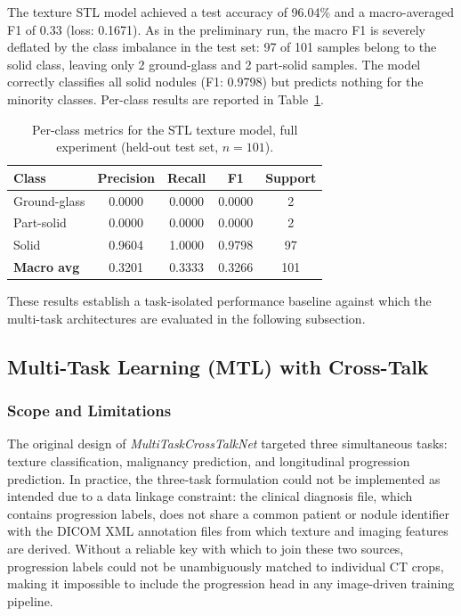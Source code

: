 The texture STL model achieved a test accuracy of 96.04\% and a macro-averaged F1 of 0.33 (loss: 0.1671). As in the preliminary run, the macro F1 is severely deflated by the class imbalance in the test set: 97 of 101 samples belong to the solid class, leaving only 2 ground-glass and 2 part-solid samples. The model correctly classifies all solid nodules (F1: 0.9798) but predicts nothing for the minority classes. Per-class results are reported in Table~\ref{tab:stl_texture_full}.

\begin{table}[h]
\centering
\caption{Per-class metrics for the STL texture model, full experiment
  (held-out test set, $n=101$).}
\label{tab:stl_texture_full}
\begin{tabular}{lcccc}
\hline
\textbf{Class} & \textbf{Precision} & \textbf{Recall} & \textbf{F1}
  & \textbf{Support} \\
\hline
Ground-glass & 0.0000 & 0.0000 & 0.0000 & 2 \\
Part-solid   & 0.0000 & 0.0000 & 0.0000 & 2 \\
Solid        & 0.9604 & 1.0000 & 0.9798 & 97 \\
\hline
\textbf{Macro avg} & 0.3201 & 0.3333 & 0.3266 & 101 \\
\hline
\end{tabular}
\end{table}

These results establish a task-isolated performance baseline against which the multi-task architectures are evaluated in the following subsection.



\subsection{Multi-Task Learning (MTL) with Cross-Talk}

\subsubsection{Scope and Limitations}

The original design of \textit{MultiTaskCrossTalkNet} targeted three simultaneous tasks: texture classification, malignancy prediction, and longitudinal progression prediction. In practice, the three-task formulation could not be implemented as intended due to a data linkage constraint: the clinical diagnosis file, which contains progression labels, does not share a common patient or nodule identifier with the DICOM XML annotation files from which texture and imaging features are derived. Without a reliable key with which to join these two sources, progression labels could not be unambiguously matched to individual CT crops, making it impossible to include the progression head in any image-driven training pipeline.

